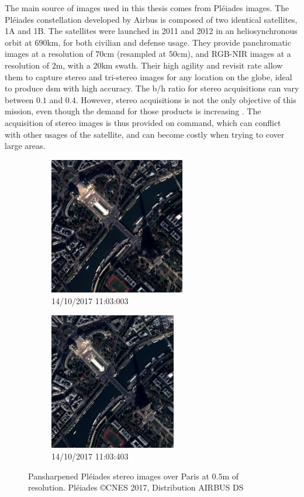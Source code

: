 The main source of images used in this thesis comes from Pléiades images. The Pléiades constellation developed by Airbus is composed of two identical satellites, 1A and 1B. The satellites were launched in 2011 and 2012 in an heliosynchronous orbit at $690$km, for both civilian and defense usage. They provide panchromatic images at a resolution of $70$cm (resampled at $50$cm), and RGB-NIR images at a resolution of $2$m, with a $20$km swath. Their high agility and revisit rate allow them to capture stereo and tri-stereo images for any location on the globe, ideal to produce \acrshort{dsm} with high accuracy. The \acrshort{b/h} ratio for stereo acquisitions can vary between $0.1$ and $0.4$. However, stereo acquisitions is not the only objective of this mission, even though the demand for those products is increasing \cite{berthier_glacier_2014, poli_radiometric_2015, rieg_pleiades_2018, loghin_potential_2020}. The acquisition of stereo images is thus provided on command, which can conflict with other usages of the satellite, and can become costly when trying to cover large areas.  
\begin{figure}
    \centering
    \begin{subfigure}{0.5\linewidth}
        \centering
        \includegraphics[height=6cm]{Images/Paris_003.jpeg}
        \caption{14/10/2017 11:03:003}
        \label{fig:Pleiade_over_Paris_a}
    \end{subfigure}\hfill
    \begin{subfigure}{0.5\linewidth}
        \centering
        \includegraphics[height=6cm]{Images/Paris_403.jpeg}
        \caption{14/10/2017 11:03:403}
        \label{fig:Pleiade_over_Paris_b}
    \end{subfigure}
    \caption{Pansharpened Pléiades stereo images over Paris at $0.5$m of resolution. Pléiades \copyright CNES 2017, Distribution AIRBUS DS}
    \label{fig:Pleiade_over_Paris}
\end{figure}

